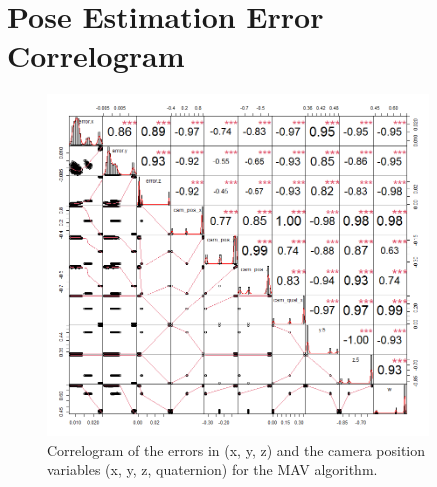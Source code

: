   
  
\newpage
\section{Pose Estimation Error Correlogram}  
\label{appendix:correlogram}
\begin{figure}[h]
        \centering
        \includegraphics[width=0.9\textwidth]{images/r_correlogram.png}
        \caption{Correlogram of the errors in (x, y, z) and the camera position variables (x, y, z, quaternion) for the MAV algorithm.}
        \label{fig:correlogram}
\end{figure}
